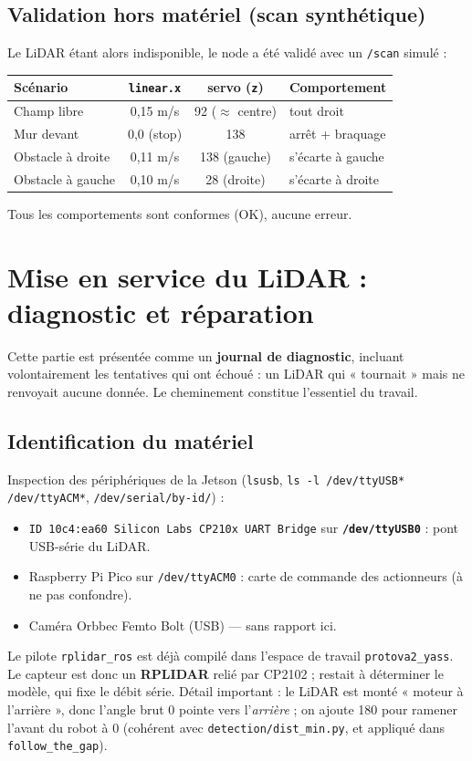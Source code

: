 \documentclass[a4paper,11pt]{article}
\begin{document}
\subsection{Validation hors matériel (scan synthétique)}\label{sec:valid-synth}
Le LiDAR étant alors indisponible, le node a été validé avec un \texttt{/scan}
simulé :
\begin{center}
\begin{tabular}{@{}lccl@{}}
\toprule
Scénario & \texttt{linear.x} & servo (\texttt{z}) & Comportement \\
\midrule
Champ libre        & 0,15 m/s & 92 ($\approx$ centre) & tout droit \\
Mur devant         & 0,0 (stop) & 138 & arrêt + braquage \\
Obstacle à droite  & 0,11 m/s & 138 (gauche) & s'écarte à gauche \\
Obstacle à gauche  & 0,10 m/s & 28 (droite)  & s'écarte à droite \\
\bottomrule
\end{tabular}
\end{center}
Tous les comportements sont conformes (\textcolor{success}{OK}), aucune erreur.

\section{Mise en service du LiDAR : diagnostic et réparation}
Cette partie est présentée comme un \textbf{journal de diagnostic}, incluant
volontairement les tentatives qui ont échoué : un LiDAR qui « tournait » mais ne
renvoyait aucune donnée. Le cheminement constitue l'essentiel du travail.

\subsection{Identification du matériel}
Inspection des périphériques de la Jetson (\texttt{lsusb}, \texttt{ls -l
/dev/ttyUSB* /dev/ttyACM*}, \texttt{/dev/serial/by-id/}) :
\begin{itemize}[leftmargin=1.4em]
  \item \texttt{ID 10c4:ea60 Silicon Labs CP210x UART Bridge} sur
        \textbf{\texttt{/dev/ttyUSB0}} : pont USB-série du LiDAR.
  \item Raspberry Pi Pico sur \texttt{/dev/ttyACM0} : carte de commande des
        actionneurs (à ne pas confondre).
  \item Caméra Orbbec Femto Bolt (USB) --- sans rapport ici.
\end{itemize}
Le pilote \texttt{rplidar\_ros} est déjà compilé dans l'espace de travail
\texttt{protova2\_yass}. Le capteur est donc un \textbf{RPLIDAR} relié par CP2102 ;
restait à déterminer le modèle, qui fixe le débit série. Détail important : le
LiDAR est monté « moteur à l'arrière », donc l'angle brut 0\textdegree{} pointe
vers l'\emph{arrière} ; on ajoute 180\textdegree{} pour ramener l'avant du robot à
0\textdegree{} (cohérent avec \texttt{detection/dist\_min.py}, et appliqué dans
\texttt{follow\_the\_gap}).
\end{document}
